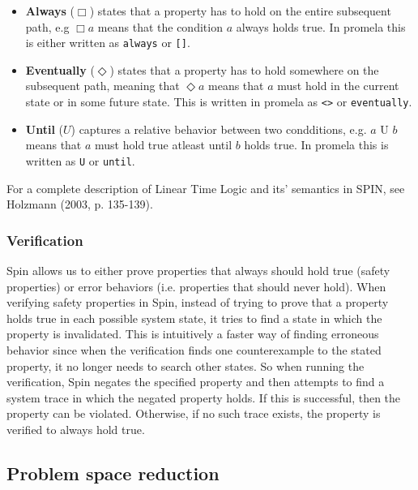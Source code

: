 \begin{itemize}
	\item[] \textbf{Always} ($\Box$) states that a property has to hold on the entire subsequent path, e.g $\Box a$ means that the condition $a$ always holds true. In promela this is either written as \texttt{always} or \texttt{[]}.
	\item[] \textbf{Eventually} ($\Diamond$) states that a property has to hold somewhere on the subsequent path, meaning that $\Diamond a$ means that $a$ must hold in the current state or in some future state. This is written in promela as \texttt{<>} or \texttt{eventually}.
	\item[] \textbf{Until} ($U$) captures a relative behavior between two condditions, e.g. $a \text{ U } b$ means that $a$ must hold true atleast until $b$ holds true. In promela this is written as \texttt{U} or \texttt{until}.
 \end{itemize}

For a complete description of Linear Time Logic and its' semantics in SPIN, see Holzmann (2003, p. 135-139).

\subsubsection{Verification}

Spin allows us to either prove properties that always should hold true (safety properties) or error behaviors (i.e. properties that should never hold). When verifying safety properties in Spin, instead of trying to prove that a property holds true in each possible system state, it tries to find a state in which the property is invalidated. This is intuitively a faster way of finding erroneous behavior since when the verification finds one counterexample to the stated property, it no longer needs to search other states. 
So when running the verification, Spin negates the specified property and then attempts to find a system trace in which the negated property holds. If this is successful, then the property can be violated. Otherwise, if no such trace exists, the property is verified to always hold true.

\subsection{Problem space reduction}


